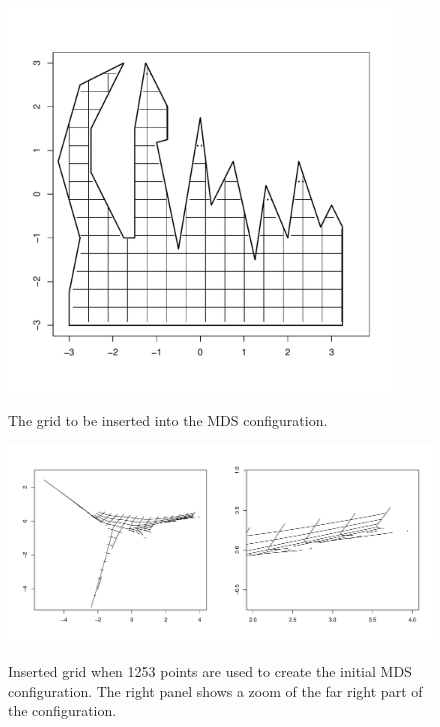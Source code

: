 \documentclass[a4paper,10pt]{article}
\begin{document}
\begin{figure}
\centering
\includegraphics[width=4in]{figs/wt2-grid-orig.pdf} \\
\caption{The grid to be inserted into the MDS configuration.}
\label{wt2-grid-orig}
\end{figure}

\begin{figure}
\centering
\includegraphics[width=5in]{figs/wt2-grid-full.pdf} \\
\caption{Inserted grid when 1253 points are used to create the initial MDS configuration. The right panel shows a zoom of the far right part of the configuration.}
\label{wt2-grid-full}
\end{figure}
\end{document}

